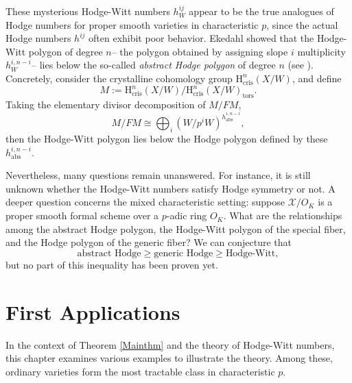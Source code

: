 \documentclass[a4paper,12pt,twoside]{report}
\newcommand{\HH}{\mathrm{H}}
\begin{document}
\begin{center}
\end{center}
\medskip


These mysterious Hodge-Witt numbers \( h_W^{ij} \) appear 
to be the true analogues of Hodge numbers for proper smooth varieties in characteristic \( p \), 
since the actual Hodge numbers \( h^{ij} \) often exhibit poor behavior. 
Ekedahl showed that the Hodge-Witt polygon of degree \( n \)--
the polygon obtained by assigning slope \( i \) multiplicity \( h_W^{i,n-i} \)--
lies below the so-called \emph{abstract Hodge polygon} of degree \( n \) (see \cite{Ek3}).
Concretely, consider the crystalline cohomology group \( \HH^n_{\mathrm{cris}}(X/W) \), and define
\[
M := \HH^n_{\mathrm{cris}}(X/W) / \HH^n_{\mathrm{cris}}(X/W)_{\mathrm{tors}}.
\]
Taking the elementary divisor decomposition of \( M/FM \),
\[
M/FM \cong \bigoplus_i (W/p^iW)^{h_{\mathrm{abs}}^{i,n-i}},
\]
then the Hodge-Witt polygon lies below the Hodge polygon defined by these \( h_{\mathrm{abs}}^{i,n-i} \).

Nevertheless, many questions remain unanswered. 
For instance, it is still unknown whether the Hodge-Witt numbers satisfy Hodge symmetry or not. 
A deeper question concerns the mixed characteristic setting: suppose \( \mathcal{X}/O_K \) 
is a proper smooth formal scheme over a \( p \)-adic ring \( O_K \). 
What are the relationships among the abstract Hodge polygon, the Hodge-Witt polygon of the special fiber, 
and the Hodge polygon of the generic fiber? We can conjecture that
\[
\text{abstract Hodge} \geqslant \text{generic Hodge} \geqslant \text{Hodge-Witt},
\]
but no part of this inequality has been proven yet.


\chapter{First Applications}\label{Chap2}

In the context of Theorem \ref{Mainthm} and the theory of Hodge-Witt numbers, 
this chapter examines various examples to illustrate the theory.  
Among these, ordinary varieties form the most tractable class in characteristic $p$.
\end{document}
